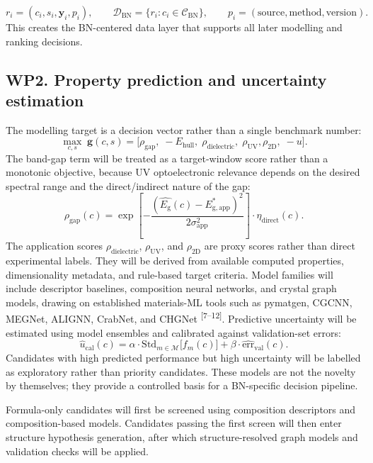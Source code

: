 \documentclass[10pt]{article}
\newcommand{\eg}{E_{\mathrm{g}}}
\newcommand{\ehull}{E_{\mathrm{hull}}}
\newcommand{\unc}{u}
\newcommand{\gapscore}{\rho_{\mathrm{gap}}}
\begin{document}
\[
  r_i=(c_i,s_i,\mathbf{y}_i,p_i),\qquad
  \mathcal{D}_{\mathrm{BN}}=\{r_i:c_i\in\mathcal{C}_{\mathrm{BN}}\},\qquad
  p_i=(\mathrm{source},\mathrm{method},\mathrm{version}).
\]
This creates the BN-centered data layer that supports all later modelling and ranking decisions.

\subsection*{WP2. Property prediction and uncertainty estimation}
The modelling target is a decision vector rather than a single benchmark number:
\[
  \max_{c,s}\; \mathbf{g}(c,s)=
  \big[\gapscore,\;-\ehull,\;\rho_{\mathrm{dielectric}},\;\rho_{\mathrm{UV}},
  \rho_{\mathrm{2D}},\;-\unc\big].
\]
The band-gap term will be treated as a target-window score rather than a monotonic objective, because UV optoelectronic relevance depends on the desired spectral range and the direct/indirect nature of the gap:
\[
  \gapscore(c)=
  \exp\!\left[-\frac{(\hat{\eg}(c)-E^{*}_{\mathrm{g,app}})^2}
  {2\sigma_{\mathrm{app}}^2}\right]\cdot \eta_{\mathrm{direct}}(c).
\]
The application scores $\rho_{\mathrm{dielectric}}$, $\rho_{\mathrm{UV}}$, and $\rho_{\mathrm{2D}}$ are proxy scores rather than direct experimental labels. They will be derived from available computed properties, dimensionality metadata, and rule-based target criteria.
Model families will include descriptor baselines, composition neural networks, and crystal graph models, drawing on established materials-ML tools such as pymatgen, CGCNN, MEGNet, ALIGNN, CrabNet, and CHGNet \textsuperscript{[7--12]}. Predictive uncertainty will be estimated using model ensembles and calibrated against validation-set errors:
\[
  \hat{\unc}_{\mathrm{cal}}(c)=
  \alpha\cdot \mathrm{Std}_{m\in\mathcal{M}}\big[f_m(c)\big]+
  \beta\cdot \widehat{\mathrm{err}}_{\mathrm{val}}(c).
\]
Candidates with high predicted performance but high uncertainty will be labelled as exploratory rather than priority candidates. These models are not the novelty by themselves; they provide a controlled basis for a BN-specific decision pipeline.

Formula-only candidates will first be screened using composition descriptors and composition-based models. Candidates passing the first screen will then enter structure hypothesis generation, after which structure-resolved graph models and validation checks will be applied.
\end{document}

